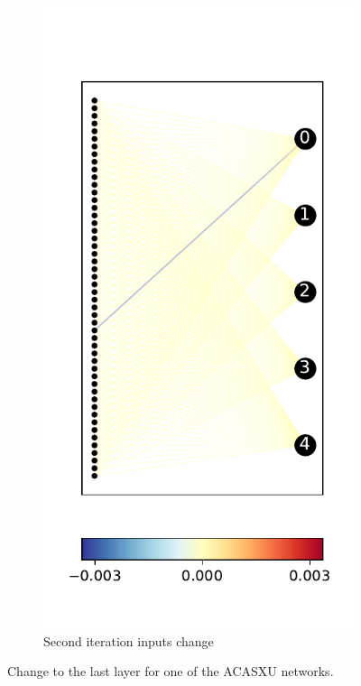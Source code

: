 \documentclass{easychair}
\begin{document}
\begin{figure}
\begin{subfigure}{0.2\linewidth}
\end{subfigure}
\begin{subfigure}{0.2\linewidth}
  \includegraphics[width=\linewidth]{./images/ACASXU_2_9_3_vals.pdf}
  \caption{Second iteration inputs change}
\end{subfigure}
\caption{Change to the last layer for one of the ACASXU networks.}
\label{fig:lastLayerACASXU}
\end{figure}
\end{document}

